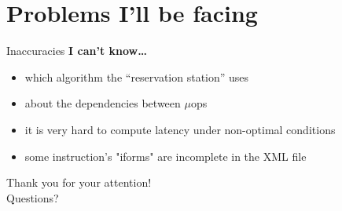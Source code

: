 \documentclass[10pt, tikz,border=2mm, xcolor=dvipsnames]{beamer}
\begin{document}
\section{Problems I'll be facing}

\begin{frame}{Inaccuracies}
\textbf{I can't know\dots}
\begin{itemize}[<+- | alert@+>]
    \item which algorithm the ``reservation station'' uses
    \item about the dependencies between $\mu$ops
\end{itemize}
\begin{itemize}[<+- | alert@+>]
    \item it is very hard to compute latency under non-optimal conditions
    \item some instruction's "iforms" are incomplete in the XML file
\end{itemize}
\end{frame}


{
\begin{frame}[standout]
  Thank you for your attention!\\
  Questions?
\end{frame}
}
\end{document}
